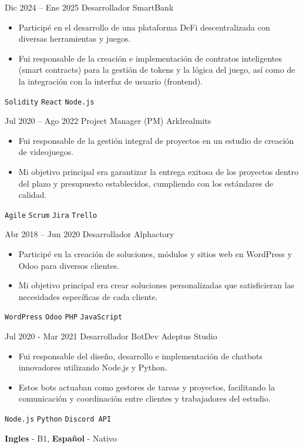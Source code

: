 \documentclass[9pt]{developercv}
\begin{document}
\vspace{-10 pt}
\begin{entrylist}
	\entry
        {Dic 2024 – Ene 2025}
		{Desarrollador}
		{SmartBank}
		{\vspace{-10pt}
        \begin{itemize}[noitemsep,topsep=0pt,parsep=0pt,partopsep=0pt, leftmargin=-1pt]
            \item Participé en el desarrollo de una plataforma DeFi descentralizada con diversas herramientas y juegos.
            \item Fui responsable de la creación e implementación de contratos inteligentes (smart contracts) para la gestión de tokens y la lógica del juego, así como de la integración con la interfaz de usuario (frontend).
        \end{itemize} 
        \texttt{Solidity} \slashsep \texttt{React} \slashsep \texttt{Node.js}}
	\entry
		{Jul 2020 – Ago 2022}
		{Project Manager (PM)}
		{Arklrealmits}
		{\vspace{-10pt}
        \begin{itemize}[noitemsep,topsep=0pt,parsep=0pt,partopsep=0pt, leftmargin=-1pt]
            \item Fui responsable de la gestión integral de proyectos en un estudio de creación de videojuegos.
            \item  Mi objetivo principal era garantizar la entrega exitosa de los proyectos dentro del plazo y presupuesto establecidos, cumpliendo con los estándares de calidad.
        \end{itemize} 
        \texttt{Agile} \slashsep \texttt{Scrum} \slashsep \texttt{Jira} \slashsep \texttt{Trello}}
	\entry
		{Abr 2018 – Jun 2020}
		{Desarrollador}
		{Alphactory}
		{\vspace{-10pt}
        \begin{itemize}[noitemsep,topsep=0pt,parsep=0pt,partopsep=0pt, leftmargin=-1pt]
            \item Participé en la creación de soluciones, módulos y sitios web en WordPress y Odoo para diversos clientes.
            \item Mi objetivo principal era crear soluciones personalizadas que satisficieran las necesidades específicas de cada cliente.
        \end{itemize} 
        \texttt{WordPress} \slashsep \texttt{Odoo} \slashsep \texttt{PHP} \slashsep \texttt{JavaScript}}
        \entry
		{Jul 2020 - Mar 2021}
		{Desarrollador BotDev}
		{Adeptus Studio}
		{\vspace{-10pt}
        \begin{itemize}[noitemsep,topsep=0pt,parsep=0pt,partopsep=0pt, leftmargin=-1pt]
            \item Fui responsable del diseño, desarrollo e implementación de chatbots innovadores utilizando Node.js y Python.
            \item Estos bots actuaban como gestores de tareas y proyectos, facilitando la comunicación y coordinación entre clientes y trabajadores del estudio.
        \end{itemize} 
        \texttt{Node.js} \slashsep \texttt{Python} \slashsep \texttt{Discord API}}
\end{entrylist}

\vspace{-10 pt}
    \vspace{-6pt}
    
    \hspace{26mm} \textbf{Ingles} - B1, \textbf{ Español} - Nativo
\end{document}
